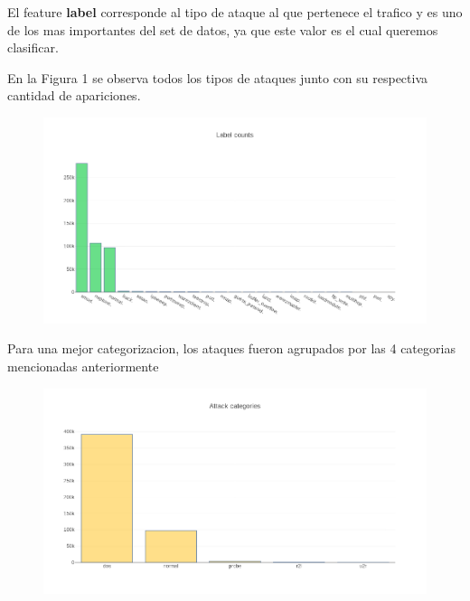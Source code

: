 \documentclass[a4paper,10pt]{article}
\begin{document}
El feature \textbf{label} corresponde al tipo de ataque al que pertenece el trafico y es uno de los mas importantes del set de datos, ya que este valor es el cual queremos clasificar.

En la Figura 1 se observa todos los tipos de ataques junto con su respectiva cantidad de apariciones.


\medskip
\begin{figure}[!htp]
\centering
\includegraphics[scale=0.5]{Wireshark/newplot.png} 
\caption{}
\end{figure}

Para una mejor categorizacion, los ataques fueron agrupados por las 4 categorias mencionadas anteriormente

\newpage
\medskip
\begin{figure}[!htp]
\centering
\includegraphics[scale=0.5]{Wireshark/newplot(1).png} 
\caption{}
\end{figure}
\end{document}
